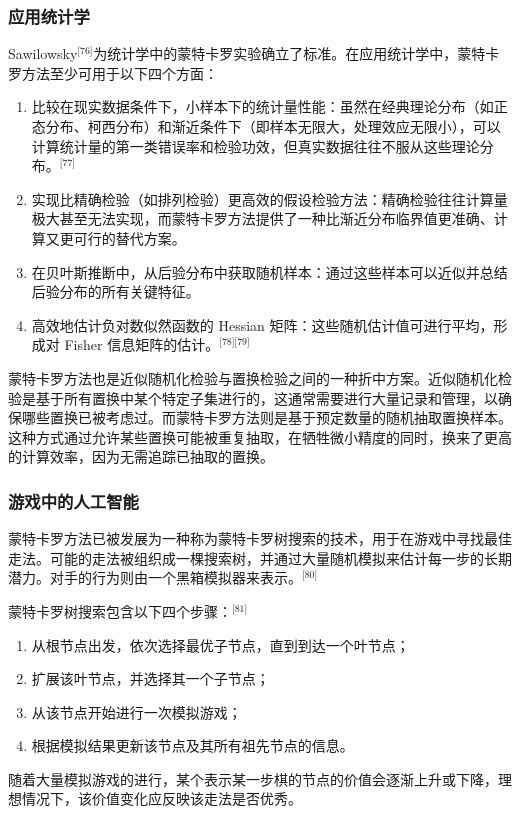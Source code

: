 \subsubsection{应用统计学}
Sawilowsky\(^\text{[76]}\)为统计学中的蒙特卡罗实验确立了标准。在应用统计学中，蒙特卡罗方法至少可用于以下四个方面：
\begin{enumerate}
\item 比较在现实数据条件下，小样本下的统计量性能：虽然在经典理论分布（如正态分布、柯西分布）和渐近条件下（即样本无限大，处理效应无限小），可以计算统计量的第一类错误率和检验功效，但真实数据往往不服从这些理论分布。\(^\text{[77]}\)
\item 实现比精确检验（如排列检验）更高效的假设检验方法：精确检验往往计算量极大甚至无法实现，而蒙特卡罗方法提供了一种比渐近分布临界值更准确、计算又更可行的替代方案。
\item 在贝叶斯推断中，从后验分布中获取随机样本：通过这些样本可以近似并总结后验分布的所有关键特征。
\item 高效地估计负对数似然函数的 Hessian 矩阵：这些随机估计值可进行平均，形成对 Fisher 信息矩阵的估计。\(^\text{[78][79]}\)
\end{enumerate}
蒙特卡罗方法也是近似随机化检验与置换检验之间的一种折中方案。近似随机化检验是基于所有置换中某个特定子集进行的，这通常需要进行大量记录和管理，以确保哪些置换已被考虑过。而蒙特卡罗方法则是基于预定数量的随机抽取置换样本。这种方式通过允许某些置换可能被重复抽取，在牺牲微小精度的同时，换来了更高的计算效率，因为无需追踪已抽取的置换。
\subsubsection{游戏中的人工智能}
蒙特卡罗方法已被发展为一种称为蒙特卡罗树搜索的技术，用于在游戏中寻找最佳走法。可能的走法被组织成一棵搜索树，并通过大量随机模拟来估计每一步的长期潜力。对手的行为则由一个黑箱模拟器来表示。\(^\text{[80]}\)

蒙特卡罗树搜索包含以下四个步骤：\(^\text{[81]}\)
\begin{enumerate}
\item 从根节点出发，依次选择最优子节点，直到到达一个叶节点；
\item 扩展该叶节点，并选择其一个子节点；
\item 从该节点开始进行一次模拟游戏；
\item 根据模拟结果更新该节点及其所有祖先节点的信息。
\end{enumerate}
随着大量模拟游戏的进行，某个表示某一步棋的节点的价值会逐渐上升或下降，理想情况下，该价值变化应反映该走法是否优秀。

